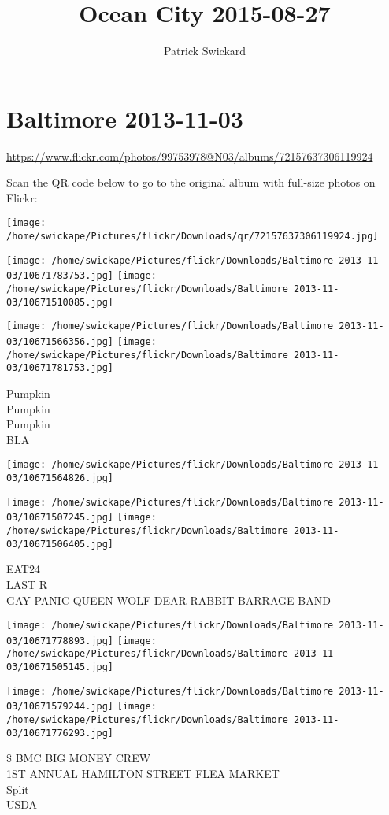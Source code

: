 \documentclass[10pt,letterpaper]{article}
\title{Ocean City 2015-08-27}
\author{Patrick Swickard}
\date{}
\begin{document}
\section*{Baltimore 2013-11-03}

\url{https://www.flickr.com/photos/99753978@N03/albums/72157637306119924}

Scan the QR code below to go to the original album with full-size photos on Flickr:

\texttt{[image: /home/swickape/Pictures/flickr/Downloads/qr/72157637306119924.jpg]}
\pagebreak

\texttt{[image: /home/swickape/Pictures/flickr/Downloads/Baltimore 2013-11-03/10671783753.jpg]}
\texttt{[image: /home/swickape/Pictures/flickr/Downloads/Baltimore 2013-11-03/10671510085.jpg]}

\texttt{[image: /home/swickape/Pictures/flickr/Downloads/Baltimore 2013-11-03/10671566356.jpg]}
\texttt{[image: /home/swickape/Pictures/flickr/Downloads/Baltimore 2013-11-03/10671781753.jpg]}

Pumpkin\\
Pumpkin\\
Pumpkin\\
BLA
\pagebreak

\texttt{[image: /home/swickape/Pictures/flickr/Downloads/Baltimore 2013-11-03/10671564826.jpg]}

\vspace{0.25in}
\texttt{[image: /home/swickape/Pictures/flickr/Downloads/Baltimore 2013-11-03/10671507245.jpg]}
\texttt{[image: /home/swickape/Pictures/flickr/Downloads/Baltimore 2013-11-03/10671506405.jpg]}

EAT24\\
LAST R\\
GAY PANIC QUEEN WOLF DEAR RABBIT BARRAGE BAND
\pagebreak

\texttt{[image: /home/swickape/Pictures/flickr/Downloads/Baltimore 2013-11-03/10671778893.jpg]}
\texttt{[image: /home/swickape/Pictures/flickr/Downloads/Baltimore 2013-11-03/10671505145.jpg]}

\texttt{[image: /home/swickape/Pictures/flickr/Downloads/Baltimore 2013-11-03/10671579244.jpg]}
\texttt{[image: /home/swickape/Pictures/flickr/Downloads/Baltimore 2013-11-03/10671776293.jpg]}

\$ BMC BIG MONEY CREW\\
1ST ANNUAL HAMILTON STREET FLEA MARKET\\
Split\\
USDA
\pagebreak
\end{document}
